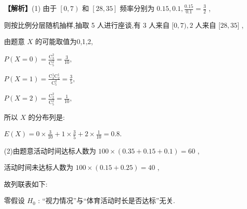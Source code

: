 \documentclass[10pt]{article}
\begin{document}
\textbf{【解析】}(1) 由于 \(\left\lbrack  {0,7}\right)\) 和 \(\left\lbrack  {{28},{35}}\right\rbrack\) 频率分别为 \({0.15},{0.1},\frac{0.15}{0.1} = \frac{3}{2}\) ,

则按比例分层随机抽样,抽取 5 人进行座谈,有 3 人来自 \(\lbrack 0,7),2\) 人来自 \(\lbrack {28},{35}\rbrack\) ,

由题意 \(X\) 的可能取值为0,1,2,

\(P\left( {X = 0}\right)  = \frac{{\mathrm{C}}_{3}^{2}}{{\mathrm{C}}_{5}^{2}} = \frac{3}{10},\)

\(P\left( {X = 1}\right)  = \frac{{\mathrm{C}}_{3}^{1}{\mathrm{C}}_{2}^{1}}{{\mathrm{C}}_{5}^{2}} = \frac{3}{5},\)

\(P\left( {X = 2}\right)  = \frac{{\mathrm{C}}_{2}^{2}}{{\mathrm{C}}_{5}^{2}} = \frac{1}{10},\)

所以 \(X\) 的分布列是:

\begin{center}
\end{center}

\(E\left( X\right)  = 0 \times  \frac{3}{10} + 1 \times  \frac{3}{5} + 2 \times  \frac{1}{10} = {0.8}.\)

(2)由题意活动时间达标人数为 \({100} \times  \left( {{0.35} + {0.15} + {0.1}}\right)  = {60}\) ,

活动时间未达标人数为 \({100} \times  \left( {{0.15} + {0.25}}\right)  = {40}\) ,

故列联表如下:

\begin{center}
\end{center}

零假设 \({H}_{0}\) : ``视力情况''与``体育活动时长是否达标''无关.
\end{document}
